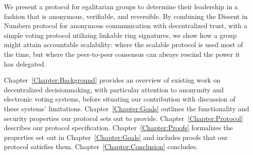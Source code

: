 We present a protocol for egalitarian groups to determine their leadership in a
fashion that is anonymous, verifiable, and reversible.  By combining the Dissent
in Numbers protocol for anonymous communication with decentralized trust, with a
simple voting protocol utilizing linkable ring signatures, we show how a group
might attain accountable scalability: where the scalable protocol is used most
of the time, but where the peer-to-peer consensus can always rescind the power
it has delegated.


Chapter~\ref{Chapter:Background} provides an overview of existing work on
decentralized decisionmaking, with particular attention to anonymity and
electronic voting systems, before situating our contribution with discussion of
these systems' limitations. Chapter~\ref{Chapter:Goals} outlines the
functionality and security properties our protocol sets out to provide.
Chapter~\ref{Chapter:Protocol} describes our protocol specification.
Chapter~\ref{Chapter:Proofs} formalizes the properties set out in
Chapter~\ref{Chapter:Goals} and includes proofs that our protocol
satisfies them. Chapter~\ref{Chapter:Conclusion} concludes.
